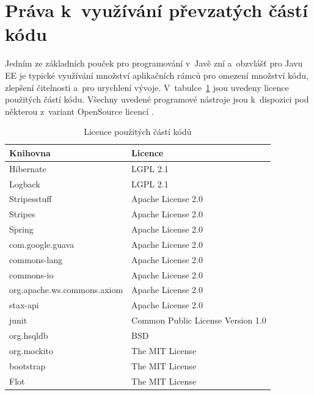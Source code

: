 \documentclass[11pt, draft, oneside]{fithesis2}
\begin{document}
\section{Práva k~využívání převzatých částí kódu}
Jedním ze základních pouček pro programování v~Javě zní  a~obzvlášť pro Javu EE je typické využívání množství aplikačních rámců pro omezení množství kódu, zlepšení čitelnosti a~pro urychlení vývoje. V~tabulce~\ref{tab:libraries:license} jsou uvedeny licence použitých částí kódu.
Všechny uvedené programové nástroje jsou k~dispozici pod některou z~variant OpenSource licencí \cite{Licence}.

\begin{table}[ht] 
\centering
\begin{tabular}{l l}
\hline 
Knihovna & Licence \\
\hline \hline
Hibernate 									& LGPL 2.1 \\
Logback 										& LGPL 2.1 \\
Stripesstuff 								& Apache License 2.0 \\ 
Stripes 										& Apache License 2.0 \\ 
Spring 											& Apache License 2.0 \\ 
com.google.guava 						& Apache License 2.0 \\
commons-lang 								& Apache License 2.0 \\
commons-io 									& Apache License 2.0 \\
org.apache.ws.commons.axiom & Apache License 2.0 \\
stax-api 										& Apache License 2.0 \\
junit 											& Common Public License Version 1.0 \\
org.hsqldb 									& BSD \\
org.mockito 								& The MIT License \\
bootstrap 									& The MIT License \\
Flot 												& The MIT License \\

\hline %
\end{tabular} 
\caption{Licence použitých částí kódů}
\label{tab:libraries:license} %
\end{table} 

\end{document}
